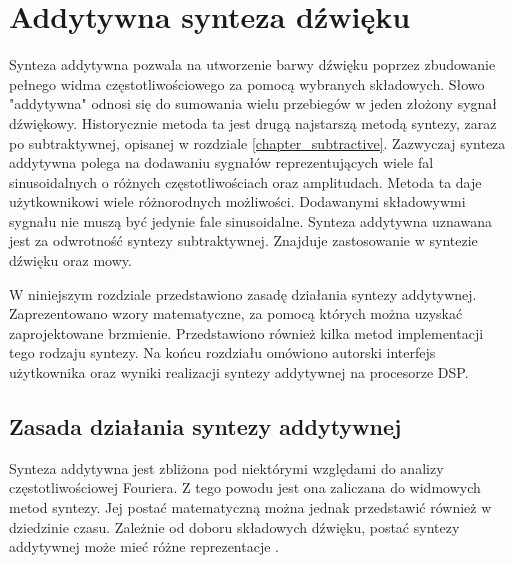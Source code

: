 \chapter{Addytywna synteza dźwięku}\label{chapter_additive}
Synteza addytywna pozwala na utworzenie barwy dźwięku poprzez zbudowanie pełnego widma częstotliwościowego za pomocą wybranych składowych. Słowo "addytywna" odnosi się do sumowania wielu przebiegów w jeden złożony sygnał dźwiękowy. Historycznie metoda ta jest drugą najstarszą metodą syntezy, zaraz po subtraktywnej, opisanej w rozdziale \ref{chapter_subtractive}.
Zazwyczaj synteza addytywna polega na dodawaniu sygnałów reprezentujących wiele fal sinusoidalnych o różnych częstotliwościach oraz amplitudach. Metoda ta daje użytkownikowi wiele różnorodnych możliwości. Dodawanymi składowywmi sygnału nie muszą być jedynie fale sinusoidalne.
Synteza addytywna uznawana jest za odwrotność syntezy subtraktywnej. Znajduje zastosowanie w syntezie dźwięku oraz mowy.

W niniejszym rozdziale przedstawiono zasadę działania syntezy addytywnej. Zaprezentowano wzory matematyczne, za pomocą których można uzyskać zaprojektowane brzmienie. Przedstawiono również kilka metod implementacji tego rodzaju syntezy. Na końcu rozdziału omówiono autorski interfejs użytkownika oraz wyniki realizacji syntezy addytywnej na procesorze DSP.

\section{Zasada działania syntezy addytywnej}
Synteza addytywna jest zbliżona pod niektórymi względami do analizy częstotliwościowej Fouriera. Z tego powodu jest ona zaliczana do widmowych metod syntezy. Jej postać matematyczną można jednak przedstawić również w dziedzinie czasu. Zależnie od doboru składowych dźwięku, postać syntezy addytywnej może mieć różne reprezentacje \cite{add_defins}.

